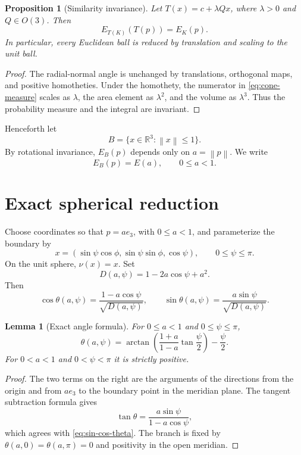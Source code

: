 \documentclass[11pt]{article}
\newtheorem{proposition}[theorem]{Proposition}
\newtheorem{lemma}[theorem]{Lemma}
\theoremstyle{definition}
\newcommand{\R}{\mathbb{R}}
\newcommand{\norm}[1]{\left\lVert #1\right\rVert}
\begin{document}
\begin{proposition}[Similarity invariance]
Let $T(x)=c+\lambda Qx$, where $\lambda>0$ and $Q\in O(3)$.  Then
\[
E_{T(K)}(T(p))=E_K(p).
\]
In particular, every Euclidean ball is reduced by translation and scaling to the unit ball.
\end{proposition}

\begin{proof}
The radial-normal angle is unchanged by translations, orthogonal maps, and positive homotheties.  Under the homothety, the numerator in \eqref{eq:cone-measure} scales as $\lambda$, the area element as $\lambda^2$, and the volume as $\lambda^3$.  Thus the probability measure and the integral are invariant.
\end{proof}

Henceforth let
\[
B=\{x\in\R^3:\norm x\leq1\}.
\]
By rotational invariance, $E_B(p)$ depends only on $a=\norm p$.  We write
\[
E_B(p)=E(a),\qquad 0\leq a<1.
\]

\section{Exact spherical reduction}

Choose coordinates so that $p=ae_3$, with $0\leq a<1$, and parameterize the boundary by
\[
x=(\sin\psi\cos\phi,\sin\psi\sin\phi,\cos\psi),
\qquad 0\leq\psi\leq\pi.
\]
On the unit sphere, $\nu(x)=x$.  Set
\begin{equation}
D(a,\psi)=1-2a\cos\psi+a^2.
\label{eq:D}
\end{equation}
Then
\begin{equation}
\cos\theta(a,\psi)
=
\frac{1-a\cos\psi}{\sqrt{D(a,\psi)}},
\qquad
\sin\theta(a,\psi)
=
\frac{a\sin\psi}{\sqrt{D(a,\psi)}}.
\label{eq:sin-cos-theta}
\end{equation}

\begin{lemma}[Exact angle formula]
For $0\leq a<1$ and $0\leq\psi\leq\pi$,
\begin{equation}
\theta(a,\psi)
=
\arctan\!\left(
\frac{1+a}{1-a}\tan\frac{\psi}{2}
\right)
-
\frac{\psi}{2}.
\label{eq:theta-half-angle}
\end{equation}
For $0<a<1$ and $0<\psi<\pi$ it is strictly positive.
\end{lemma}

\begin{proof}
The two terms on the right are the arguments of the directions from the origin and from $ae_3$ to the boundary point in the meridian plane.  The tangent subtraction formula gives
\[
\tan\theta
=
\frac{a\sin\psi}{1-a\cos\psi},
\]
which agrees with \eqref{eq:sin-cos-theta}.  The branch is fixed by $\theta(a,0)=\theta(a,\pi)=0$ and positivity in the open meridian.
\end{proof}
\end{document}
